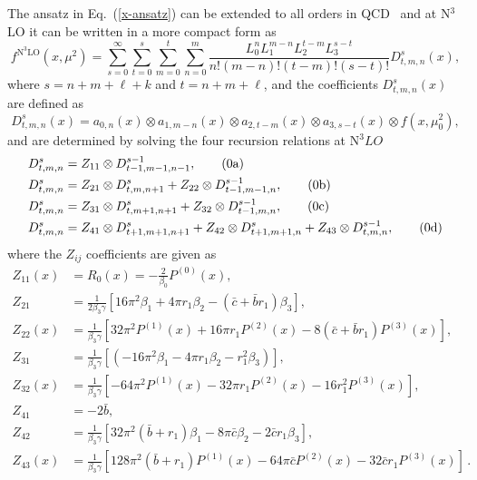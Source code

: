 \documentclass[preprint,12pt]{elsarticle}
\begin{document}
The ansatz in Eq.~(\ref{x-ansatz}) can be extended to all orders in QCD~\cite{Cafarella:2005zj,Cafarella:2008du,Guzzi:2006wx,Hampson:2025pvi} and at N$^3$LO it can be written in a more compact form as
%
\begin{equation}
  f^{\mathrm{N}^3\mathrm{LO}}(x,\mu^2) = \sum_{s=0}^\infty\sum_{t=0}^s\sum_{m=0}^t\sum_{n=0}^m \frac{L_0^n L_1^{m-n}L_2^{t-m}L_3^{s-t}}{n!(m-n)!(t-m)!(s-t)!}D^s_{t,m,n}(x),
  \label{eq:full-exact-ansatz}
\end{equation}
%
where $s=n+m+\ell+k$ and $t=n+m+\ell$, and the coefficients $D_{t,m,n}^{s}(x)$ are defined as
\begin{equation}
D_{t,m,n}^{s}(x)= a_{0,n}(x)\otimes
a_{1,m-n}(x)\otimes a_{2,t-m}(x) \otimes a_{3,s-t}(x) \otimes f(x,\mu_0^2),
\end{equation}
and are determined by solving the four recursion relations at N$^3LO$
%
\begin{align}
  D^s_{t,m,n} &= Z_{11} \otimes D^{s-1}_{t-1,m-1,n-1}, \label{eq:n3lo-resum-1}\tag{\theequation{a}}\\
  D^s_{t,m,n} &= Z_{21}\otimes D^s_{t,m,n+1} + Z_{22} \otimes D^{s-1}_{t-1,m-1,n}, 
                \label{eq:n3lo-resum-2}\tag{\theequation{b}}\\
  D^s_{t,m,n} &= Z_{31} \otimes D^s_{t,m+1,n+1} + Z_{32} \otimes D^{s-1}_{t-1,m,n}, 
                \label{eq:n3lo-resum-3}\tag{\theequation{c}}\\
  D^s_{t,m,n} &= Z_{41} \otimes D^s_{t+1,m+1,n+1} + Z_{42} \otimes D^s_{t+1,m+1,n} + Z_{43} \otimes D^{s-1}_{t,m,n},\label{eq:n3lo-resum-4}\tag{\theequation{d}}
\end{align}
%
where the $Z_{ij}$ coefficients are given as
\begin{align}
  Z_{11}(x) &= R_0(x) = -\frac{2}{\beta_0} P^{(0)}(x),  
              \nonumber\\
  Z_{21} &= \frac{1}{2\beta_3\gamma}\left[ 16\pi^2\beta_1 + 4\pi r_1\beta_2 - (\bar{c} + \bar{b} r_1)\beta_3 \right], 
           \nonumber\\
  Z_{22}(x) &= \frac{1}{\beta_3\gamma}\left[32\pi^2P^{(1)}(x) + 16\pi r_1 P^{(2)}(x) - 8(\bar{c}+\bar{b}r_1)P^{(3)} (x)\right], 
              \nonumber\\
  Z_{31} &=\frac{1}{\beta_3\gamma} \left[(-16\pi^2\beta_1 - 4\pi r_1\beta_2 - r_1^2\beta_3)\right], 
           \nonumber\\
  Z_{32}(x) &= \frac{1}{\beta_3\gamma} \left[- 64\pi^2 P^{(1)}(x) - 32\pi r_1 P^{(2)}(x) - 16 r_1^2 P^{(3)}(x)\right], 
              \nonumber\\
  Z_{41} &= -2 \bar{b},  
           \nonumber\\
  Z_{42} &= \frac{1}{\beta_3\gamma}\left[ 32\pi^2(\bar{b}+r_1)\beta_1  -8\pi \bar{c}\beta_2 - 2\bar{c}r_1\beta_3 \right],  
           \nonumber\\
  Z_{43}(x)& = \frac{1}{\beta_3\gamma}\left[ 128\pi^2(\bar{b}+r_1) P^{(1)}(x) - 64\pi \bar{c} P^{(2)}(x) - 32 \bar{c} r_1 P^{(3)}(x) \right]\,.
             \label{Zij-def}
\end{align}
\end{document}

